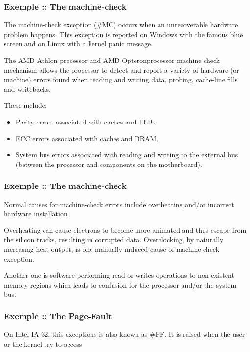 \begin{frame}
  \frametitle{Exemple :: The machine-check}

The machine-check exception (\#MC) occurs when an unrecoverable hardware problem happens. This exception is reported on Windows with the famous blue screen and on Linux with a \r{kernel panic} message.

\-

The AMD Athlon processor and AMD Opteron\texttrademark processor machine check mechanism allows the processor to detect and report a variety of hardware (or machine) errors found when reading and writing data, probing, cache-line fills and writebacks.

\-

These include:

  \begin{itemize}
    \item
      Parity errors associated with caches and TLBs.
    \item
     ECC errors associated with caches and DRAM.
    \item
     System bus errors associated with reading and writing to the external bus (between the processor and components on the motherboard).
  \end{itemize}

\end{frame}


\begin{frame}
  \frametitle{Exemple :: The machine-check}


Normal causes for machine-check errors include overheating and/or incorrect hardware installation.

\-

Overheating can cause electrons to become more animated and thus escape from the silicon tracks, resulting in corrupted data. Overclocking, by naturally increasing heat output, is one manually induced cause of machine-check exception.

\-

Another one is software performing read or writes operations to non-existent memory regions which leads to confusion for the processor and/or the system bus. 

\end{frame}


\begin{frame}
  \frametitle{Exemple :: The Page-Fault}

On Intel IA-32, this exceptions is also known as \#PF. It is raised when the user or the kernel try to access 

\end{frame}


